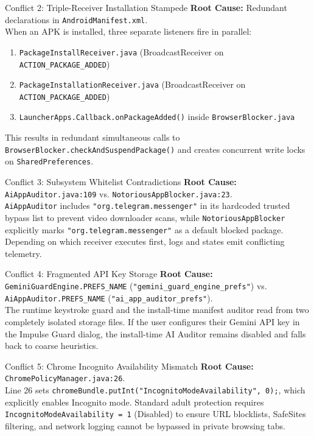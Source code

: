 \documentclass[11pt,a4paper]{article}
\begin{document}
\begin{conflictbox}{Conflict 2: Triple-Receiver Installation Stampede}
\textbf{Root Cause:} Redundant declarations in \texttt{AndroidManifest.xml}.\\[0.2cm]
When an APK is installed, three separate listeners fire in parallel:
\begin{enumerate}
    \item \texttt{PackageInstallReceiver.java} (BroadcastReceiver on \texttt{ACTION\_PACKAGE\_ADDED})
    \item \texttt{PackageInstallationReceiver.java} (BroadcastReceiver on \texttt{ACTION\_PACKAGE\_ADDED})
    \item \texttt{LauncherApps.Callback.onPackageAdded()} inside \texttt{BrowserBlocker.java}
\end{enumerate}
This results in redundant simultaneous calls to \texttt{BrowserBlocker.checkAndSuspendPackage()} and creates concurrent write locks on \texttt{SharedPreferences}.
\end{conflictbox}

\begin{conflictbox}{Conflict 3: Subsystem Whitelist Contradictions}
\textbf{Root Cause:} \texttt{AiAppAuditor.java:109} vs. \texttt{NotoriousAppBlocker.java:23}.\\[0.2cm]
\texttt{AiAppAuditor} includes \texttt{"org.telegram.messenger"} in its hardcoded trusted bypass list to prevent video downloader scans, while \texttt{NotoriousAppBlocker} explicitly marks \texttt{"org.telegram.messenger"} as a default blocked package. Depending on which receiver executes first, logs and states emit conflicting telemetry.
\end{conflictbox}

\begin{conflictbox}{Conflict 4: Fragmented API Key Storage}
\textbf{Root Cause:} \texttt{GeminiGuardEngine.PREFS\_NAME} (\texttt{"gemini\_guard\_engine\_prefs"}) vs. \texttt{AiAppAuditor.PREFS\_NAME} (\texttt{"ai\_app\_auditor\_prefs"}).\\[0.2cm]
The runtime keystroke guard and the install-time manifest auditor read from two completely isolated storage files. If the user configures their Gemini API key in the Impulse Guard dialog, the install-time AI Auditor remains disabled and falls back to coarse heuristics.
\end{conflictbox}

\begin{conflictbox}{Conflict 5: Chrome Incognito Availability Mismatch}
\textbf{Root Cause:} \texttt{ChromePolicyManager.java:26}.\\[0.2cm]
Line 26 sets \texttt{chromeBundle.putInt("IncognitoModeAvailability", 0);}, which explicitly enables Incognito mode. Standard adult protection requires \texttt{IncognitoModeAvailability = 1} (Disabled) to ensure URL blocklists, SafeSites filtering, and network logging cannot be bypassed in private browsing tabs.
\end{conflictbox}
\end{document}
